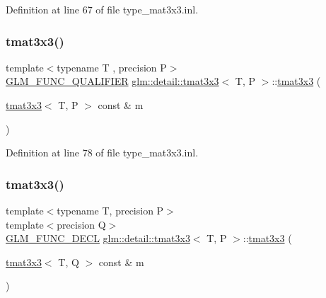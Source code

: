 Definition at line 67 of file type\+\_\+mat3x3.\+inl.

\mbox{\label{structglm_1_1detail_1_1tmat3x3_ad29c55dfadf40179fd4d911535465f6c}} 
\subsubsection{\texorpdfstring{tmat3x3()}{tmat3x3()}\hspace{0.1cm}{\footnotesize\ttfamily [2/22]}}
{\footnotesize\ttfamily template$<$typename T , precision P$>$ \\
\hyperlink{setup_8hpp_a33fdea6f91c5f834105f7415e2a64407}{G\+L\+M\+\_\+\+F\+U\+N\+C\+\_\+\+Q\+U\+A\+L\+I\+F\+I\+ER} \hyperlink{structglm_1_1detail_1_1tmat3x3}{glm\+::detail\+::tmat3x3}$<$ T, P $>$\+::\hyperlink{structglm_1_1detail_1_1tmat3x3}{tmat3x3} (\begin{DoxyParamCaption}\item[{\hyperlink{structglm_1_1detail_1_1tmat3x3}{tmat3x3}$<$ T, P $>$ const \&}]{m }\end{DoxyParamCaption})}



Definition at line 78 of file type\+\_\+mat3x3.\+inl.

\mbox{\label{structglm_1_1detail_1_1tmat3x3_a088a58e6773a067fdf873610d46283c1}} 
\subsubsection{\texorpdfstring{tmat3x3()}{tmat3x3()}\hspace{0.1cm}{\footnotesize\ttfamily [3/22]}}
{\footnotesize\ttfamily template$<$typename T, precision P$>$ \\
template$<$precision Q$>$ \\
\hyperlink{setup_8hpp_ab2d052de21a70539923e9bcbf6e83a51}{G\+L\+M\+\_\+\+F\+U\+N\+C\+\_\+\+D\+E\+CL} \hyperlink{structglm_1_1detail_1_1tmat3x3}{glm\+::detail\+::tmat3x3}$<$ T, P $>$\+::\hyperlink{structglm_1_1detail_1_1tmat3x3}{tmat3x3} (\begin{DoxyParamCaption}\item[{\hyperlink{structglm_1_1detail_1_1tmat3x3}{tmat3x3}$<$ T, Q $>$ const \&}]{m }\end{DoxyParamCaption})}

